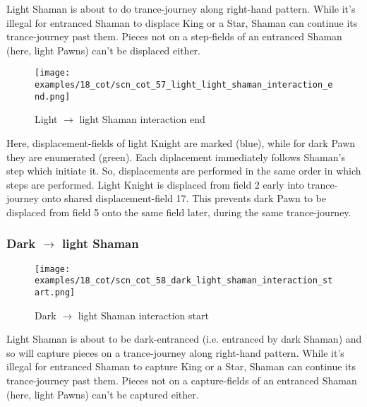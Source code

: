 Light Shaman is about to do trance-journey along right-hand pattern. While it's
illegal for entranced Shaman to displace King or a Star, Shaman can continue its
trance-journey past them. Pieces not on a step-fields of an entranced Shaman (here,
light Pawns) can't be displaced either.

\clearpage %

\noindent
\begin{figure}[!h]
\texttt{[image: examples/18\_cot/scn\_cot\_57\_light\_light\_shaman\_interaction\_end.png]}
\caption{Light $\rightarrow$ light Shaman interaction end}
\label{fig:scn_cot_57_light_light_shaman_interaction_end}
\end{figure}

Here, displacement-fields of light Knight are marked (blue), while for dark Pawn
they are enumerated (green). Each diplacement immediately follows Shaman's step
which initiate it. So, displacements are performed in the same order in which steps
are performed. Light Knight is displaced from field 2 early into trance-journey
onto shared displacement-field 17. This prevents dark Pawn to be displaced from
field 5 onto the same field later, during the same trance-journey.

\clearpage %

\subsubsection*{Dark $\rightarrow$ light Shaman}
\label{sec:Conquest of Tlalocan/Trance-journey/Interactions/Dark --> light Shaman}

\vspace*{-1.4\baselineskip}
\noindent
\begin{figure}[!h]
\texttt{[image: examples/18\_cot/scn\_cot\_58\_dark\_light\_shaman\_interaction\_start.png]}
\caption{Dark $\rightarrow$ light Shaman interaction start}
\label{fig:scn_cot_58_dark_light_shaman_interaction_start}
\end{figure}

Light Shaman is about to be dark-entranced (i.e. entranced by dark Shaman) and
so will capture pieces on a trance-journey along right-hand pattern. While it's
illegal for entranced Shaman to capture King or a Star, Shaman can continue its
trance-journey past them. Pieces not on a capture-fields of an entranced Shaman
(here, light Pawns) can't be captured either.


